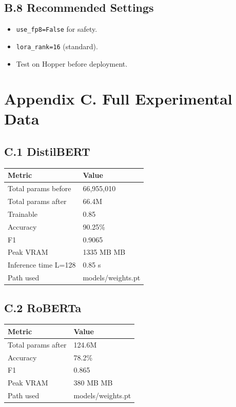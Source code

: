 \subsection{B.8 Recommended Settings}

\begin{itemize}
\item \texttt{use\_fp8=False} for safety.
\item \texttt{lora\_rank=16} (standard).
\item Test on Hopper before deployment.

\end{itemize}


\section{Appendix C. Full Experimental Data}

\subsection{C.1 DistilBERT}

\begin{table}[H]
\centering
\small
\begin{tabular}{ll}
\toprule
\textbf{Metric} & \textbf{Value} \\
\midrule
Total params before & 66,955,010 \\
Total params after & 66.4M \\
Trainable & 0.85 \\
Accuracy & 90.25\% \\
F1 & 0.9065 \\
Peak VRAM & 1335 MB MB \\
Inference time L=128 & 0.85 s \\
Path used & models/weights.pt \\
\bottomrule
\end{tabular}
\end{table}

\subsection{C.2 RoBERTa}

\begin{table}[H]
\centering
\small
\begin{tabular}{ll}
\toprule
\textbf{Metric} & \textbf{Value} \\
\midrule
Total params after & 124.6M \\
Accuracy & 78.2\% \\
F1 & 0.865 \\
Peak VRAM & 380 MB MB \\
Path used & models/weights.pt \\
\bottomrule
\end{tabular}
\end{table}

